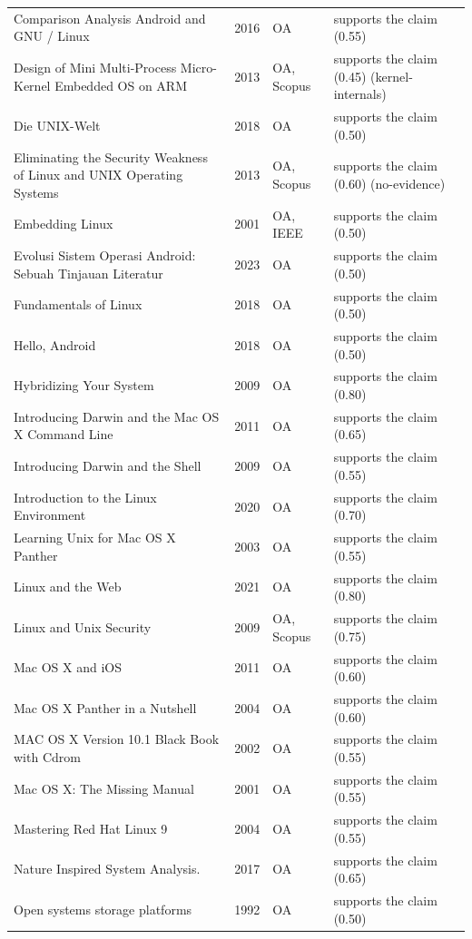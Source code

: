 \begin{longtable}{@{}%
  >{\raggedright\arraybackslash}p{}c%
  >{\raggedright\arraybackslash}p{}%
  >{\raggedright\arraybackslash}p{}@{}}
Comparison Analysis Android and GNU / Linux & 2016 & OA & supports the claim (0.55) \\
Design of Mini Multi-Process Micro-Kernel Embedded OS on ARM & 2013 & OA, Scopus & supports the claim (0.45) (kernel-internals) \\
Die UNIX-Welt & 2018 & OA & supports the claim (0.50) \\
Eliminating the Security Weakness of Linux and UNIX Operating Systems & 2013 & OA, Scopus & supports the claim (0.60) (no-evidence) \\
Embedding Linux & 2001 & OA, IEEE & supports the claim (0.50) \\
Evolusi Sistem Operasi Android: Sebuah Tinjauan Literatur & 2023 & OA & supports the claim (0.50) \\
Fundamentals of Linux & 2018 & OA & supports the claim (0.50) \\
Hello, Android & 2018 & OA & supports the claim (0.50) \\
Hybridizing Your System & 2009 & OA & supports the claim (0.80) \\
Introducing Darwin and the Mac OS X Command Line & 2011 & OA & supports the claim (0.65) \\
Introducing Darwin and the Shell & 2009 & OA & supports the claim (0.55) \\
Introduction to the Linux Environment & 2020 & OA & supports the claim (0.70) \\
Learning Unix for Mac OS X Panther & 2003 & OA & supports the claim (0.55) \\
Linux and the Web & 2021 & OA & supports the claim (0.80) \\
Linux and Unix Security & 2009 & OA, Scopus & supports the claim (0.75) \\
Mac OS X and iOS & 2011 & OA & supports the claim (0.60) \\
Mac OS X Panther in a Nutshell & 2004 & OA & supports the claim (0.60) \\
MAC OS X Version 10.1 Black Book with Cdrom & 2002 & OA & supports the claim (0.55) \\
Mac OS X: The Missing Manual & 2001 & OA & supports the claim (0.55) \\
Mastering Red Hat Linux 9 & 2004 & OA & supports the claim (0.55) \\
Nature Inspired System Analysis. & 2017 & OA & supports the claim (0.65) \\
Open systems storage platforms & 1992 & OA & supports the claim (0.50) \\

\end{longtable}
